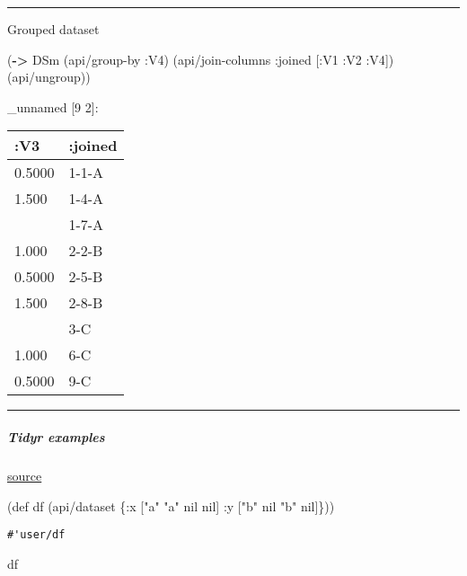 \documentclass[]{article}
\newenvironment{Shaded}{\begin{snugshade}}{\end{snugshade}}
\newcommand{\KeywordTok}[1]{\textcolor[rgb]{0.13,0.29,0.53}{\textbf{#1}}}
\newcommand{\StringTok}[1]{\textcolor[rgb]{0.31,0.60,0.02}{#1}}
\newcommand{\FunctionTok}[1]{\textcolor[rgb]{0.00,0.00,0.00}{#1}}
\newcommand{\VariableTok}[1]{\textcolor[rgb]{0.00,0.00,0.00}{#1}}
\newcommand{\BuiltInTok}[1]{#1}
\newcommand{\AttributeTok}[1]{\textcolor[rgb]{0.77,0.63,0.00}{#1}}
\newcommand{\NormalTok}[1]{#1}
\let\oldsubparagraph\subparagraph
\renewcommand{\subparagraph}[1]{\oldsubparagraph{#1}\mbox{}}
\begin{document}
\begin{center}\rule{0.5\linewidth}{0.5pt}\end{center}

Grouped dataset

\begin{Shaded}
\begin{Highlighting}[]
\NormalTok{(}\KeywordTok{->}\NormalTok{ DSm}
\NormalTok{    (api/group-by }\AttributeTok{:V4}\NormalTok{)}
\NormalTok{    (api/join-columns }\AttributeTok{:joined}\NormalTok{ [}\AttributeTok{:V1} \AttributeTok{:V2} \AttributeTok{:V4}\NormalTok{])}
\NormalTok{    (api/ungroup))}
\end{Highlighting}
\end{Shaded}

\_unnamed {[}9 2{]}:

\begin{longtable}[]{@{}ll@{}}
\toprule
:V3 & :joined\tabularnewline
\midrule
\endhead
0.5000 & 1-1-A\tabularnewline
1.500 & 1-4-A\tabularnewline
& 1-7-A\tabularnewline
1.000 & 2-2-B\tabularnewline
0.5000 & 2-5-B\tabularnewline
1.500 & 2-8-B\tabularnewline
& 3-C\tabularnewline
1.000 & 6-C\tabularnewline
0.5000 & 9-C\tabularnewline
\bottomrule
\end{longtable}

\begin{center}\rule{0.5\linewidth}{0.5pt}\end{center}

\subparagraph{Tidyr examples}\label{tidyr-examples}

\href{https://tidyr.tidyverse.org/reference/unite.html}{source}

\begin{Shaded}
\begin{Highlighting}[]
\NormalTok{(}\BuiltInTok{def}\FunctionTok{ df }\NormalTok{(api/dataset \{}\AttributeTok{:x}\NormalTok{ [}\StringTok{"a"} \StringTok{"a"} \VariableTok{nil} \VariableTok{nil}\NormalTok{]}
                      \AttributeTok{:y}\NormalTok{ [}\StringTok{"b"} \VariableTok{nil} \StringTok{"b"} \VariableTok{nil}\NormalTok{]\}))}
\end{Highlighting}
\end{Shaded}

\begin{verbatim}
#'user/df
\end{verbatim}

\begin{Shaded}
\begin{Highlighting}[]
\NormalTok{df}
\end{Highlighting}
\end{Shaded}
\end{document}
